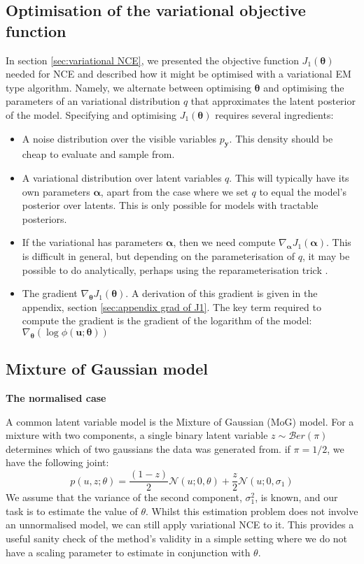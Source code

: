 \documentclass[11pt, oneside]{article}
\newcommand{\thetab}{{\boldsymbol{\theta}}}
\newcommand{\alphab}{{\boldsymbol{\alpha}}}
\newcommand{\pnorm}{p}
\newcommand{\pnoise}{p_{ \mathbf y}}
\renewcommand{\u}{{\mathbf u}}
\begin{document}
\subsection{Optimisation of the variational objective function}
\label{sec:optimisation of var objective}
In section \ref{sec:variational NCE}, we presented the objective function $J_1(\thetab)$ needed for NCE and described how it might be optimised with a variational EM type algorithm. Namely, we alternate between optimising $\thetab$ and optimising the parameters of an variational distribution $q$ that approximates the latent posterior of the model. Specifying and optimising $J_1(\thetab)$ requires several ingredients:
\begin{itemize}
    \item A noise distribution over the visible variables $\pnoise$. This density should be cheap to evaluate and sample from.
    \item A variational distribution over latent variables $q$. This will typically have its own parameters $\alphab$, apart from the case where we set $q$ to equal the model's posterior over latents. This is only possible for models with tractable posteriors. 
    \item If the variational has parameters $\alphab$, then we need compute $\nabla_{\alphab} J_1(\alphab)$. This is difficult in general, but depending on the parameterisation of $q$, it may be possible to do analytically, perhaps using the reparameterisation trick \citep{kingma2015variational}.
    \item The gradient $\nabla_{\thetab} J_1(\thetab)$. A derivation of this gradient is given in the appendix, section \ref{sec:appendix grad of J1}. The key term required to compute the gradient is the gradient of the logarithm of the model: $\nabla_{\thetab}(\log \phi(\u; \thetab))$
\end{itemize}



\subsection{Mixture of Gaussian model}
\label{sec:mog}

\noindent \textbf{The normalised case}

A common latent variable model is the Mixture of Gaussian (MoG) model. For a mixture with two components, a single binary latent variable $z \sim \mathcal{B}er(\pi)$ determines which of two gaussians the data was generated from. if $\pi = 1/2$, we have the following joint:
\begin{equation}
\pnorm(u, z; \theta) = \frac{(1-z)}{2} \mathcal{N}(u; 0, \theta) + \frac{z}{2} \mathcal{N}(u; 0, \sigma_1)
\label{eq:mog standard}
\end{equation}
We assume that the variance of the second component, $\sigma_1^2$, is known, and our task is to estimate the value of $\theta$. Whilst this estimation problem does not involve an unnormalised model, we can still apply variational NCE to it. This provides a useful sanity check of the method's validity in a simple setting where we do not have a scaling parameter to estimate in conjunction with $\theta$.
\end{document}
